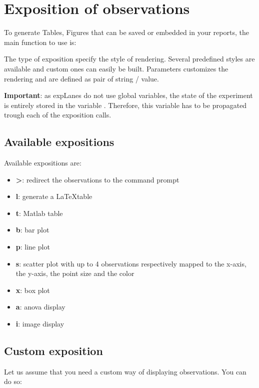 \documentclass[a4paper,fleqn]{tufte-handout}
\newcommand{\explanes}{\textsf{expLanes} }
\begin{document}
\section{Exposition of observations}

To generate Tables, Figures that can be saved or embedded in your reports, the main function to use is:


The type of exposition specify the style of rendering. Several predefined styles are available and custom ones can easily be built. Parameters customizes the rendering and are defined as pair of string / value.

\textbf{Important}: as \explanes do not use global variables, the state of the experiment is entirely stored in the variable . Therefore, this variable has to be propagated trough each of the exposition calls.

\subsection{Available expositions}

Available expositions are:
\begin{itemize}
\item \textbf{>}: redirect the observations to the command prompt
\item \textbf{l}: generate a \LaTeX table
\item \textbf{t}: Matlab table
\item \textbf{b}: bar plot
\item \textbf{p}: line plot
\item \textbf{s}: scatter plot with up to 4 observations respectively mapped to the x-axis, the y-axis, the point size and the color
\item \textbf{x}: box plot
\item \textbf{a}: anova display
\item \textbf{i}: image display
\end{itemize}

\subsection{Custom exposition}

Let us assume that you need a custom way of displaying observations. You can do so:

\end{document}
